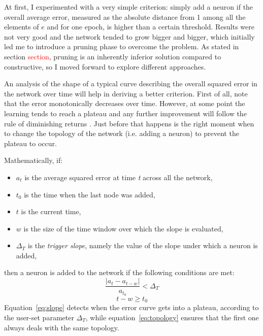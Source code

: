 \documentclass[11pt,a4paper]{report}
\begin{document}
				At first, I experimented with a very simple criterion: simply add a neuron if the overall average error, measured as the absolute distance from 1 among all the elements of $e$ and for one epoch, is higher than a certain threshold. Results were not very good and the network tended to grow bigger and bigger, which initially led me to introduce a pruning phase to overcome the problem. As stated in section \textcolor{red}{section}, pruning is an inherently inferior solution compared to constructive, so I moved forward to explore different approaches.
				
				An analysis of the shape of a typical curve describing the overall squared error in the network over time will help in deriving a better criterion. First of all, note that the error monotonically decreases over time. However, at some point the learning tends to reach a plateau and any further improvement will follow the rule of diminishing returns \cite{ash1989dynamic}. Just before that happens is the right moment when to change the topology of the network (i.e. adding a neuron) to prevent the plateau to occur.
				
				Mathematically, if:
				\begin{itemize}
					\item $a_t$ is the average squared error at time \emph{t} across all the network,
					\item $t_0$ is the time when the last node was added,
					\item $t$ is the current time,
					\item $w$ is the size of the time window over which the slope is evaluated,
					\item $\Delta_T$ is the \emph{trigger slope}, namely the value of the slope under which a neuron is added,
				\end{itemize}
				then a neuron is added to the network if the following conditions are met:
				\begin{equation}
					\label{eq:slope}
					\frac{\left| a_t - a_{t-w} \right|}{a_{t_0}} < \Delta_T
				\end{equation}
				\begin{equation}
					\label{eq:topology}
					t - w \geq t_0
				\end{equation}
				Equation~\ref{eq:slope} detects when the error curve gets into a plateau, according to the user-set parameter $\Delta_T$, while equation~\ref{eq:topology} ensures that the first one always deals with the same topology.
				
\end{document}
